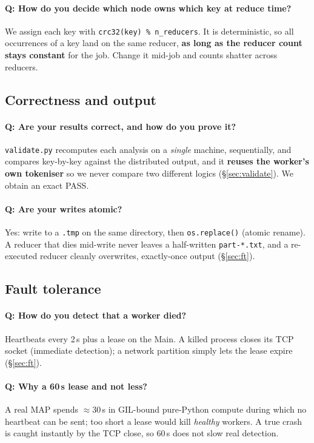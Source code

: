 \documentclass[11pt,a4paper]{article}
\newcommand{\code}[1]{\texttt{\small #1}}
\begin{document}
\paragraph{Q: How do you decide which node owns which key at reduce time?}
We assign each key with \code{crc32(key)\,\%\,n\_reducers}. It is deterministic,
so all occurrences of a key land on the same reducer, \textbf{as long as the
reducer count stays constant} for the job. Change it mid-job and counts shatter
across reducers.

\subsection{Correctness and output}

\paragraph{Q: Are your results correct, and how do you prove it?}
\code{validate.py} recomputes each analysis on a \emph{single} machine,
sequentially, and compares key-by-key against the distributed output, and it
\textbf{reuses the worker's own tokeniser} so we never compare two different
logics (\S\ref{sec:validate}). We obtain an exact PASS.

\paragraph{Q: Are your writes atomic?}
Yes: write to a \code{.tmp} on the same directory, then \code{os.replace()}
(atomic rename). A reducer that dies mid-write never leaves a half-written
\code{part-*.txt}, and a re-executed reducer cleanly overwrites, exactly-once
output (\S\ref{sec:ft}).

\subsection{Fault tolerance}

\paragraph{Q: How do you detect that a worker died?}
Heartbeats every 2\,s plus a lease on the Main. A killed process closes its TCP
socket (immediate detection); a network partition simply lets the lease expire
(\S\ref{sec:ft}).

\paragraph{Q: Why a 60\,s lease and not less?}
A real MAP spends $\approx$30\,s in GIL-bound pure-Python compute during which no
heartbeat can be sent; too short a lease would kill \emph{healthy} workers. A true
crash is caught instantly by the TCP close, so 60\,s does not slow real detection.
\end{document}
